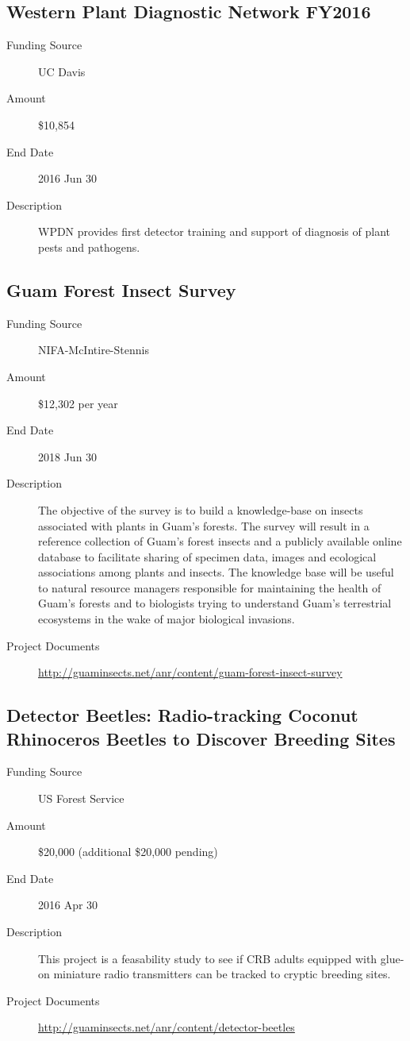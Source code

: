 \documentclass[12pt,oneside,english]{scrbook}
\begin{document}
\subsection{Western Plant Diagnostic Network FY2016}
\begin{description}
	\item[Funding Source] UC Davis
	\item[Amount] \$10,854
	\item[End Date] 2016 Jun 30
	\item[Description] WPDN provides first detector training and support of diagnosis of plant pests and pathogens. 
\end{description}

\subsection{Guam Forest Insect Survey}
\begin{description}
	\item[Funding Source] NIFA-McIntire-Stennis
	\item[Amount] \$12,302 per year
	\item[End Date] 2018 Jun 30
	\item[Description] The objective of the survey is to build a knowledge-base on insects associated
with plants in Guam's forests. The survey will result in a reference collection of Guam's
forest insects and a publicly available online database to facilitate sharing of specimen
data, images and ecological associations among plants and insects.
The knowledge base will be useful to natural resource managers responsible for maintaining the health of Guam's forests and to biologists trying to understand Guam's
terrestrial ecosystems in the wake of major biological invasions.
	\item[Project Documents] \url{http://guaminsects.net/anr/content/guam-forest-insect-survey}
\end{description}

\subsection{Detector Beetles: Radio-tracking Coconut Rhinoceros Beetles to Discover Breeding Sites}
\begin{description}
	\item[Funding Source] US Forest Service
	\item[Amount] \$20,000 (additional \$20,000 pending)
	\item[End Date] 2016 Apr 30
	\item[Description] This project is a feasability study to see if CRB adults equipped with glue-on miniature radio transmitters can be tracked to cryptic breeding sites.
	\item[Project Documents] \url{http://guaminsects.net/anr/content/detector-beetles}
\end{description} 
\end{document}
